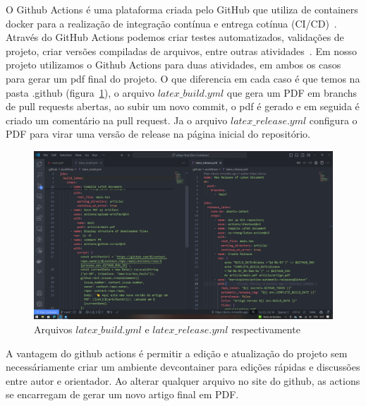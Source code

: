 O Github Actions é uma plataforma criada pelo GitHub que utiliza de containers docker para a realização de integração contínua e entrega cotínua (CI/CD)~\cite{github:02}. Através do GitHub Actions podemos criar testes automatizados, validações de projeto, criar versões compiladas de arquivos, entre outras atividades~\cite{github:02}. Em nosso projeto utilizamos o Github Actions para duas atividades, em ambos os casos para gerar um pdf final do projeto. O que diferencia em cada caso é que temos na pasta .github (figura~\ref{fig:image15}), o arquivo $latex\_build.yml$ que gera um PDF em branchs de pull requests abertas, ao subir um novo commit, o pdf é gerado e em seguida é criado um comentário na pull request. Ja o arquivo $latex\_release.yml$ configura o PDF para virar uma versão de release na página inicial do repositório.

\begin{figure}[ht]
	\centering
	\includegraphics[width=.5\textwidth]{./images/image15.png}
	\caption{Arquivos $latex\_build.yml$ e $latex\_release.yml$ respectivamente}
	\label{fig:image15}
\end{figure}

A vantagem do github actions é permitir a edição e atualização do projeto sem necessáriamente criar um ambiente devcontainer para edições rápidas e discussões entre autor e orientador. Ao alterar qualquer arquivo no site do github, as actions se encarregam de gerar um novo artigo final em PDF.